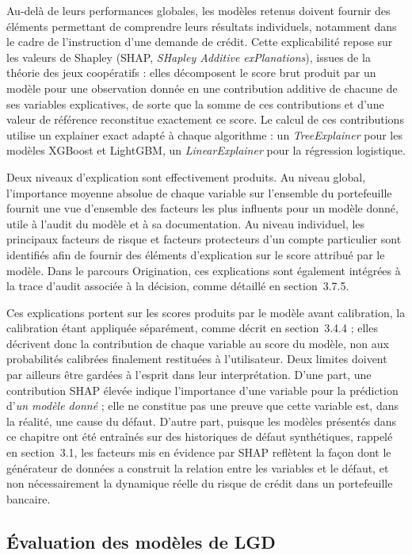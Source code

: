 Au-delà de leurs performances globales, les modèles retenus doivent fournir des éléments permettant de comprendre leurs résultats individuels, notamment dans le cadre de l'instruction d'une demande de crédit. Cette explicabilité repose sur les valeurs de Shapley (SHAP, \emph{SHapley Additive exPlanations}), issues de la théorie des jeux coopératifs \parencite{LundbergLee2017} : elles décomposent le score brut produit par un modèle pour une observation donnée en une contribution additive de chacune de ses variables explicatives, de sorte que la somme de ces contributions et d'une valeur de référence reconstitue exactement ce score. Le calcul de ces contributions utilise un explainer exact adapté à chaque algorithme : un \emph{TreeExplainer} pour les modèles XGBoost et LightGBM, un \emph{LinearExplainer} pour la régression logistique.

Deux niveaux d'explication sont effectivement produits. Au niveau global, l'importance moyenne absolue de chaque variable sur l'ensemble du portefeuille fournit une vue d'ensemble des facteurs les plus influents pour un modèle donné, utile à l'audit du modèle et à sa documentation. Au niveau individuel, les principaux facteurs de risque et facteurs protecteurs d'un compte particulier sont identifiés afin de fournir des éléments d'explication sur le score attribué par le modèle. Dans le parcours Origination, ces explications sont également intégrées à la trace d'audit associée à la décision, comme détaillé en section~3.7.5.

Ces explications portent sur les scores produits par le modèle avant calibration, la calibration étant appliquée séparément, comme décrit en section~3.4.4 ; elles décrivent donc la contribution de chaque variable au score du modèle, non aux probabilités calibrées finalement restituées à l'utilisateur. Deux limites doivent par ailleurs être gardées à l'esprit dans leur interprétation. D'une part, une contribution SHAP élevée indique l'importance d'une variable pour la prédiction d'\emph{un modèle donné} ; elle ne constitue pas une preuve que cette variable est, dans la réalité, une cause du défaut. D'autre part, puisque les modèles présentés dans ce chapitre ont été entraînés sur des historiques de défaut synthétiques, rappelé en section~3.1, les facteurs mis en évidence par SHAP reflètent la façon dont le générateur de données a construit la relation entre les variables et le défaut, et non nécessairement la dynamique réelle du risque de crédit dans un portefeuille bancaire.

\subsection{Évaluation des modèles de LGD}

